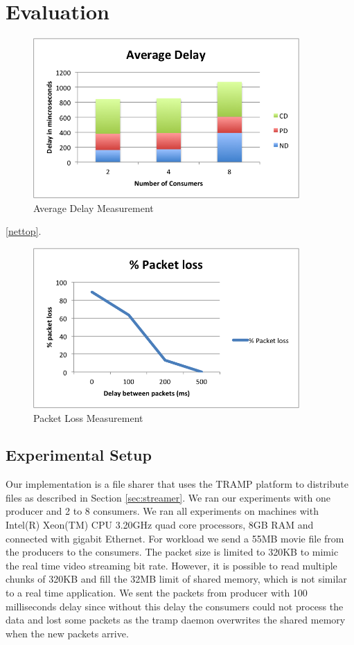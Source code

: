\section{Evaluation}
\label{sec:eval}
\begin{center}
\begin{figure}[ht!]
 \centering
 \includegraphics[width=4.0in]{avgdelay.png}
\caption{Average Delay Measurement}
\label{fig:delay}
\end{figure}
\end{center}
\ref{nettop}.
\begin{center}
\begin{figure}[ht!]
 \centering
 \includegraphics[width=4.0in]{packetloss.png}
\caption{Packet Loss Measurement}
\label{fig:pktloss}
\end{figure}
\end{center}
\subsection{Experimental Setup}
Our implementation is a file sharer that uses the TRAMP platform to distribute files as described in Section \ref{sec:streamer}. We ran our experiments with one producer and 2 to 8 consumers. We ran all experiments on machines with Intel(R) Xeon(TM) CPU 3.20GHz quad core processors, 8GB RAM and connected with gigabit Ethernet. For workload we send a 55MB movie file from the producers to the consumers. The packet size is limited to 320KB to mimic the real time video streaming bit rate. However, it is possible to read multiple chunks of 320KB and fill the 32MB limit of shared memory, which is not similar to a real time application. We sent the packets from producer with 100 milliseconds delay since without this delay the consumers could not process the data and lost some packets as the tramp daemon overwrites the shared memory when the new packets arrive.






